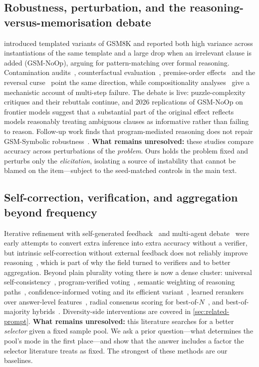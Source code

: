 \subsection{Robustness, perturbation, and the reasoning-versus-memorisation debate}

\citet{mirzadeh2025gsmsymbolic} introduced templated variants of GSM8K and
reported both high variance across instantiations of the same template and a
large drop when an irrelevant clause is added (GSM-NoOp), arguing for
pattern-matching over formal reasoning. Contamination
audits~\citep{zhang2024gsm1k}, counterfactual
evaluation~\citep{wu2024reciting}, premise-order
effects~\citep{chen2024premise} and the reversal
curse~\citep{berglund2024reversal} point the same direction, while
compositionality analyses~\citep{dziri2023faithfate} give a mechanistic account
of multi-step failure. The debate is live: puzzle-complexity critiques and
their rebuttals continue, and 2026 replications of GSM-NoOp on frontier models
suggest that a substantial part of the original effect reflects models
reasonably treating ambiguous clauses as informative rather than failing to
reason. Follow-up
work finds that program-mediated reasoning does not repair GSM-Symbolic
robustness~\citep{reasoningcodeboth2026}. \textbf{What remains unresolved:}
these studies compare accuracy across perturbations of the \emph{problem}. Ours
holds the problem fixed and perturbs only the \emph{elicitation}, isolating a
source of instability that cannot be blamed on the item---subject to the
seed-matched controls in the main text.

\subsection{Self-correction, verification, and aggregation beyond frequency}

Iterative refinement with self-generated feedback~\citep{madaan2023selfrefine}
and multi-agent debate~\citep{du2024debate} were early attempts to convert extra
inference into extra accuracy without a verifier, but intrinsic self-correction
without external feedback does not reliably improve
reasoning~\citep{huang2024cannotselfcorrect,kamoi2024whencan}, which is part of
why the field turned to verifiers and to better aggregation. Beyond plain
plurality voting there is now a dense cluster: universal
self-consistency~\citep{chen2023universal}, program-verified
voting~\citep{prove2024}, semantic weighting of reasoning
paths~\citep{weightedreasoning2024}, confidence-informed voting and its
efficient variant~\citep{veccisc2026}, learned rerankers over answer-level
features~\citep{risc2026}, radial consensus scoring for
best-of-$N$~\citep{rcs2026}, and best-of-majority
hybrids~\citep{bestofmajority2025}.
Diversity-side interventions are covered in
\cref{sec:related-prompt}. \textbf{What remains unresolved:}
this literature searches for a better \emph{selector} given a fixed sample
pool. We ask a prior question---what determines the pool's mode in the first
place---and show that the answer includes a factor the selector literature
treats as fixed. The strongest of these methods are our baselines.

